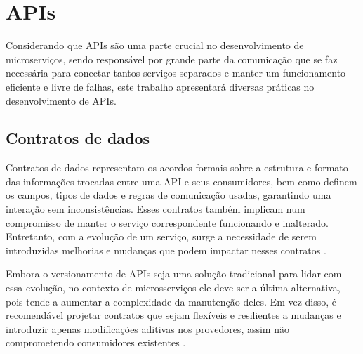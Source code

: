 
\section{APIs}\label{boas-praticas-apis}

Considerando que APIs são uma parte crucial no desenvolvimento de microserviços, sendo responsável por grande parte da comunicação que se faz necessária para conectar tantos serviços separados e manter um funcionamento eficiente e livre de falhas, este trabalho apresentará diversas práticas no desenvolvimento de APIs.

\subsection{Contratos de dados}\label{subsecao-contratos-de-dados}
Contratos de dados representam os acordos formais sobre a estrutura e formato das informações trocadas entre uma API e seus consumidores, bem como definem os campos, tipos de dados e regras de comunicação usadas, garantindo uma interação sem inconsistências. Esses contratos também implicam num compromisso de manter o serviço correspondente funcionando e inalterado. Entretanto, com a evolução de um serviço, surge a necessidade de serem introduzidas melhorias e mudanças que podem impactar nesses contratos \cite{martin-fowler-microservices}.

Embora o versionamento de APIs seja uma solução tradicional para lidar com essa evolução, no contexto de microsserviços ele deve ser a última alternativa, pois tende a aumentar a complexidade da manutenção deles. Em vez disso, é recomendável projetar contratos que sejam flexíveis e resilientes a mudanças e introduzir apenas modificações aditivas nos provedores, assim não comprometendo consumidores existentes \cite{martin-fowler-microservices}.


